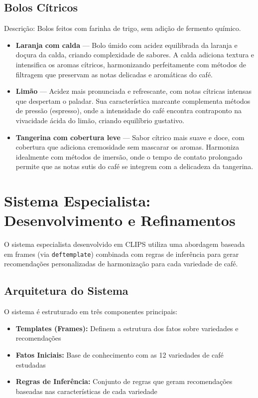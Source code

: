 \documentclass[a4paper,12pt]{article}
\begin{document}
\subsection{Bolos Cítricos}
Descrição: Bolos feitos com farinha de trigo, sem adição de fermento químico.
\begin{itemize}
  \item \textbf{Laranja com calda} — Bolo úmido com acidez equilibrada da laranja e doçura da calda, criando complexidade de sabores. A calda adiciona textura e intensifica os aromas cítricos, harmonizando perfeitamente com métodos de filtragem que preservam as notas delicadas e aromáticas do café.
  \item \textbf{Limão} — Acidez mais pronunciada e refrescante, com notas cítricas intensas que despertam o paladar. Sua característica marcante complementa métodos de pressão (espresso), onde a intensidade do café encontra contraponto na vivacidade ácida do limão, criando equilíbrio gustativo.
  \item \textbf{Tangerina com cobertura leve} — Sabor cítrico mais suave e doce, com cobertura que adiciona cremosidade sem mascarar os aromas. Harmoniza idealmente com métodos de imersão, onde o tempo de contato prolongado permite que as notas sutis do café se integrem com a delicadeza da tangerina.
\end{itemize}


\section{Sistema Especialista: Desenvolvimento e Refinamentos}

O sistema especialista desenvolvido em CLIPS utiliza uma abordagem baseada em frames (via \texttt{deftemplate}) combinada com regras de inferência para gerar recomendações personalizadas de harmonização para cada variedade de café.

\subsection{Arquitetura do Sistema}
O sistema é estruturado em três componentes principais:
\begin{itemize}
  \item \textbf{Templates (Frames):} Definem a estrutura dos fatos sobre variedades e recomendações
  \item \textbf{Fatos Iniciais:} Base de conhecimento com as 12 variedades de café estudadas
  \item \textbf{Regras de Inferência:} Conjunto de regras que geram recomendações baseadas nas características de cada variedade
\end{itemize}
\end{document}
